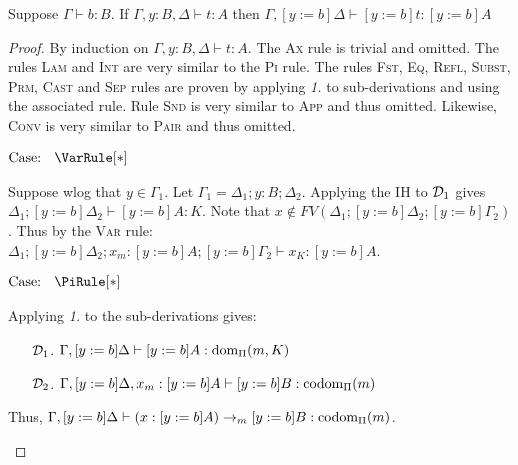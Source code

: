 \begin{lemma}[Substitution]
    \label{lem:2:subst}
    Suppose $\Gamma \vdash b : B$.
    If $\Gamma, y : B, \Delta \vdash t : A$ then $\Gamma, [y := b]\Delta \vdash [y := b]t : [y := b]A$
\end{lemma}
\begin{proof}
    By induction on $\Gamma, y : B, \Delta \vdash t : A$.
    The \textsc{Ax} rule is trivial and omitted.
    The rules \textsc{Lam} and \textsc{Int} are very similar to the \textsc{Pi} rule.
    The rules \textsc{Fst}, \textsc{Eq}, \textsc{Refl}, \textsc{Subst}, \textsc{Prm}, \textsc{Cast} and \textsc{Sep} rules are proven by applying \textit{1.} to sub-derivations and using the associated rule.
    Rule \textsc{Snd} is very similar to \textsc{App} and thus omitted.
    Likewise, \textsc{Conv} is very similar to \textsc{Pair} and thus omitted.

    $\text{Case: }\begin{array}{c} \VarRule[*] \end{array}$
    \begin{proofcase}
        Suppose wlog that $y \in \Gamma_1$.
        Let $\Gamma_1 = \Delta_1; y : B; \Delta_2$.
        Applying the IH to $\mathcal{D}_{1}$ gives $\Delta_1; [y := b]\Delta_2 \vdash [y := b]A : K$.
        Note that $x \notin FV(\Delta_1; [y := b]\Delta_2; [y := b]\Gamma_2)$.
        Thus by the \textsc{Var} rule: $\Delta_1; [y := b]\Delta_2; x_m : [y := b]A; [y := b]\Gamma_2 \vdash x_K : [y := b]A$.
    \end{proofcase}

    $\text{Case: }\begin{array}{c} \PiRule[*] \end{array}$
    \begin{proofcase}
        Applying \textit{1.} to the sub-derivations gives:
        \begin{enumerate}
            \item[$\mathcal{D}_{1}$.] $\Gamma, [y := b]\Delta \vdash [y := b]A : \textnormal{dom}_\Pi(m, K)$
            \item[$\mathcal{D}_{2}$.] $\Gamma, [y := b]\Delta, x_m : [y := b]A \vdash [y := b]B : \textnormal{codom}_\Pi(m)$
        \end{enumerate}
        Thus, $\Gamma, [y := b]\Delta \vdash (x : [y := b]A) \to_m [y := b]B : \textnormal{codom}_\Pi(m)$.
    \end{proofcase}


\end{proof}
